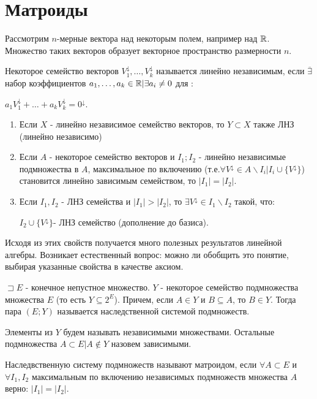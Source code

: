 \section {Матроиды}
Рассмотрим $n$-мерные вектора над некоторым полем, например над $\mathbb{R}$. Множество таких векторов образует векторное пространство размерности $n$.\par
Некоторое семейство векторов $V^{\downarrow}_1,\ldots, V^{\downarrow}_k$ называется линейно независимым, если $\overline{\exists}$ набор коэффициентов $a_1, \ldots, a_k \in \mathbb{R} | \exists a_i \neq 0$ для : \par $a_1V^{\downarrow}_1 + \ldots + a_kV^{\downarrow}_k = 0^{\downarrow}$.\\ 

\prok 
\begin{enumerate}
\item Если $X$ - линейно независимое семейство векторов, то $Y \subset X$ также ЛНЗ (линейно независимо) 
\item Если $A$ - некоторое семейство векторов и $I_1;I_2$ - линейно независимые подмножества в $A$, максимальное по включению (т.е.$\forall V^{\downarrow} \in A \backslash I_i | I_i\cup \{ V^{\downarrow} \} $) становится линейно зависимым семейством, то $|I_1| = |I_2|$.
\item Если $I_1,I_2$ - ЛНЗ семейства и $|I_1| > |I_2|$, то $\exists V^{\downarrow} \in I_1 \backslash I_2 $ такой, что:\par 
$I_2 \cup \{ V^{\downarrow} \} $- ЛНЗ семейство (дополнение до базиса).                                                             
\end{enumerate}

\note Исходя из этих свойств получается много полезных результатов линейной алгебры. Возникает естественный вопрос: можно ли обобщить это понятие, выбирая указанные свойства в качестве аксиом. 

\opr $\sqsupset E $ - конечное непустное множество. $Y$ - некоторое семейство подмножества множества $E$ (то есть $Y \subseteq 2^E$). Причем, если $A \in Y$ и $ B \subseteq A$, то $ B \in Y$. Тогда пара $(E;Y)$ называется наследственной системой подмножеств.

\opr Элементы из $Y$ будем называть независимыми множествами. Остальные подмножества $A \subset E | A \notin Y $ назовем зависимыми.

\opr Наследвственную систему подмножеств называют матроидом, если $ \forall A \subset E$ и $ \forall I_1,I_2$ максимальным по включению независимых подмножеств множества $A$ верно: $|I_1| = |I_2|$.

